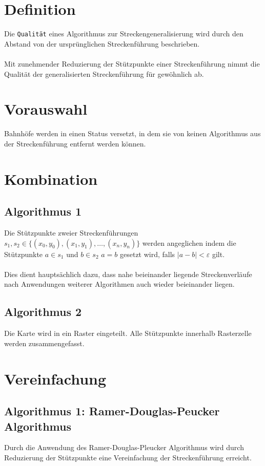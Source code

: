 \documentclass[twoside]{scrartcl}
\begin{document}
\section{Definition}
Die \texttt{Qualität} eines Algorithmus zur Streckengeneralisierung
wird durch den Abstand von der ursprünglichen Streckenführung
beschrieben.\\\\
Mit zunehmender Reduzierung der Stützpunkte einer Streckenführung
nimmt die Qualität der generalisierten Streckenführung für
gewöhnlich ab.
\section{Vorauswahl}
Bahnhöfe werden in einen Status versetzt, in dem sie von keinen
Algorithmus aus der Streckenführung entfernt werden können.
\section{Kombination}
\subsection{Algorithmus 1}
Die Stützpunkte zweier Streckenführungen
$s_1, s_2 \in \{(x_0, y_0), (x_1, y_1), \ldots, (x_n, y_n)\}$
werden angeglichen indem die Stützpunkte
$a \in s_1$ und  $b \in s_2$ $a = b$ gesetzt wird, falls
$|a - b| < \varepsilon$ gilt.\\
\\
Dies dient hauptsächlich dazu, dass nahe beieinander liegende
Streckenverläufe nach Anwendungen weiterer Algorithmen auch
wieder beieinander liegen.
\subsection{Algorithmus 2}
Die Karte wird in ein Raster eingeteilt. Alle Stützpunkte innerhalb
Rasterzelle werden zusammengefasst.
\section{Vereinfachung}
\subsection{Algorithmus 1: Ramer-Douglas-Peucker Algorithmus}
Durch die Anwendung des Ramer-Douglas-Pleucker Algorithmus
wird durch Reduzierung der Stützpunkte eine Vereinfachung
der Streckenführung erreicht.
\end{document}

